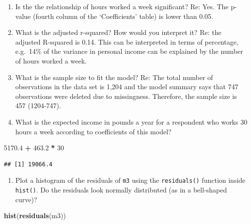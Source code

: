 \documentclass[
]{book}
\newenvironment{Shaded}{\begin{snugshade}}{\end{snugshade}}
\newcommand{\DecValTok}[1]{\textcolor[rgb]{0.00,0.00,0.81}{#1}}
\newcommand{\FloatTok}[1]{\textcolor[rgb]{0.00,0.00,0.81}{#1}}
\newcommand{\FunctionTok}[1]{\textcolor[rgb]{0.13,0.29,0.53}{\textbf{#1}}}
\newcommand{\NormalTok}[1]{#1}
\newcommand{\SpecialCharTok}[1]{\textcolor[rgb]{0.81,0.36,0.00}{\textbf{#1}}}
\providecommand{\tightlist}{%
  \setlength{\itemsep}{0pt}\setlength{\parskip}{0pt}}
\begin{document}
\begin{enumerate}
\def\labelenumi{\arabic{enumi}.}
\setcounter{enumi}{2}
\tightlist
\item
  Is the the relationship of hours worked a week significant?
  Re: Yes. The p-value (fourth column of the `Coefficients' table) is lower than 0.05.
\item
  What is the adjusted r-squared? How would you interpret it?
  Re: the adjusted R-squared is 0.14. This can be interpreted in terms of percentage, e.g.~14\% of the variance in personal income can be explained by the number of hours worked a week.
\item
  What is the sample size to fit the model?
  Re: The total number of observations in the data set is 1,204 and the model summary says that 747 observations were deleted due to missingness. Therefore, the sample size is 457 (1204-747).
\item
  What is the expected income in pounds a year for a respondent who works 30 hours a week according to coefficients of this model?
\end{enumerate}

\begin{Shaded}
\begin{Highlighting}[]
\FloatTok{5170.4} \SpecialCharTok{+} \FloatTok{463.2} \SpecialCharTok{*} \DecValTok{30}
\end{Highlighting}
\end{Shaded}

\begin{verbatim}
## [1] 19066.4
\end{verbatim}

\begin{enumerate}
\def\labelenumi{\arabic{enumi}.}
\setcounter{enumi}{6}
\tightlist
\item
  Plot a histogram of the residuals of \texttt{m3} using the \texttt{residuals()} function inside \texttt{hist()}. Do the residuals look normally distributed (as in a bell-shaped curve)?
\end{enumerate}

\begin{Shaded}
\begin{Highlighting}[]
\FunctionTok{hist}\NormalTok{(}\FunctionTok{residuals}\NormalTok{(m3))}
\end{Highlighting}
\end{Shaded}
\end{document}
